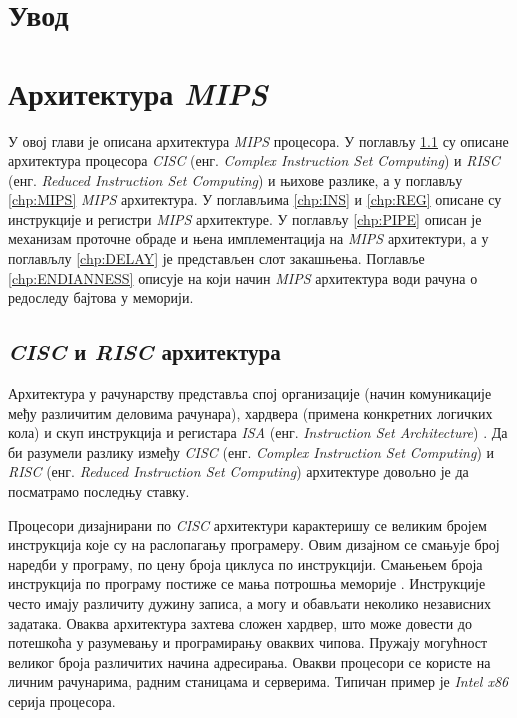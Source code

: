 \documentclass[12pt,oneside]{memoir}
\begin{document}
\frontmatter

\naslovna

\komisija

\posveta{}

\apstrakt

\tableofcontents*

\mainmatter

\chapter*{Увод}

\chapter{Архитектура \textit{MIPS}}

У овој глави је описана архитектура \textit{MIPS} процесора. У поглављу \ref{chp:CR} су описане архитектура
процесора \textit{CISC} (енг. \textit{Complex Instruction Set Computing}) и \textit{RISC} (енг. \textit{Reduced Instruction Set Computing})
и њихове разлике, а у поглављу \ref{chp:MIPS} \textit{MIPS} архитектура. У поглављима \ref{chp:INS} и \ref{chp:REG} описане су инструкције
и регистри \textit{MIPS} архитектуре. У поглављу \ref{chp:PIPE} описан је механизам проточне обраде и њена имплементација на \textit{MIPS} архитектури,
а у поглављлу \ref{chp:DELAY} је представљен слот закашњења. Поглавље \ref{chp:ENDIANNESS} описује на који начин \textit{MIPS}
архитектура води рачуна о редоследу бајтова у меморији.

\section{\textit{CISC} и \textit{RISC} архитектура} \label{chp:CR}

Архитектура у рачунарству представља спој организације (начин комуникације међу различитим деловима рачунара),
хардвера (примена конкретних логичких кола) и скуп инструкција и регистара \textit{ISA} (енг.
\textit{Instruction Set Architecture}) \cite{ARCH}. Да би разумели разлику између \textit{CISC} (енг.
\textit{Complex Instruction Set Computing}) и \textit{RISC} (енг. \textit{Reduced Instruction Set
Computing}) архитектуре довољно је да посматрамо последњу ставку.

Процесори дизајнирани по \textit{CISC} архитектури карактеришу се великим бројем инструкција које су на раслопагању
програмеру. Овим дизајном се смањује број наредби у програму, по цену броја циклуса по инструкцији. Смањењем броја
инструкција по програму постиже се мања потрошња меморије \cite{CR}. Инструкције често имају различиту дужину
записа, а могу и обављати неколико независних задатака. Оваква архитектура захтева сложен хардвер, што може довести
до потешкоћа у разумевању и програмирању оваквих чипова. Пружају могућност великог броја различитих начина
адресирања. Овакви процесори се користе на личним рачунарима, радним станицама и серверима. Типичан пример је
\textit{Intel x86} серија процесора.
\end{document}
